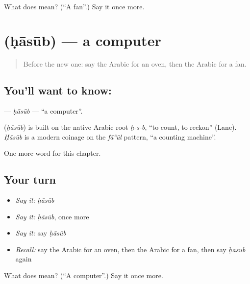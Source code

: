 \begin{tcolorbox}[breakable,colback=teal!4,colframe=teal!35!black,title={Before you move on}]
What does  mean? (\textquotedblleft{}A fan\textquotedblright{}.) Say it once more.
\end{tcolorbox}
\section[\texorpdfstring{\ar{حاسوب} (ḥāsūb)}{حاسوب (ḥāsūb)}]{ (ḥāsūb) — a computer}

\label{lesson:AR-C116-hasub}



\begin{quote}
Before the new one: say the Arabic for an oven, then the Arabic for a fan.
\end{quote}

\subsection*{You'll want to know: }
\textbf{} — \emph{ḥāsūb} — \textquotedblleft{}a computer\textquotedblright{}.

\begin{cousinweb}
\textbf{} (\emph{ḥāsūb}) is built on the native Arabic root \emph{ḥ-s-b}, \textquotedblleft{}to count, to reckon\textquotedblright{} (Lane). \emph{Ḥāsūb} is a modern coinage on the \emph{fāʿūl} pattern, \textquotedblleft{}a counting machine\textquotedblright{}.
\end{cousinweb}

\begin{grammarlens}[title={What you've built}]
One more word for this chapter.
\end{grammarlens}

\subsection*{Your turn}
\begin{itemize}
\raggedright
  \item \emph{Say it:} \emph{ḥāsūb}
  \item \emph{Say it:} \emph{ḥāsūb}, once more
  \item \emph{Say it:} say \emph{ḥāsūb}
  \item \emph{Recall:} say the Arabic for an oven, then the Arabic for a fan, then say \emph{ḥāsūb} again
\end{itemize}

\begin{tcolorbox}[breakable,colback=teal!4,colframe=teal!35!black,title={Before you move on}]
What does  mean? (\textquotedblleft{}A computer\textquotedblright{}.) Say it once more.
\end{tcolorbox}
